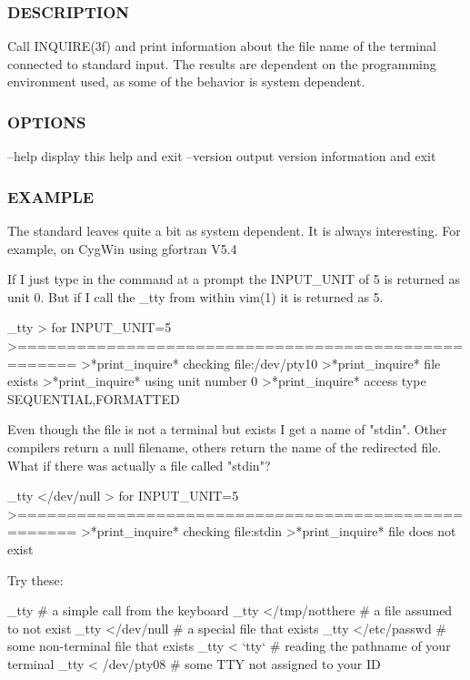  \subsubsection*{D\+E\+S\+C\+R\+I\+P\+T\+I\+ON}

Call I\+N\+Q\+U\+I\+R\+E(3f) and print information about the file name of the terminal connected to standard input. The results are dependent on the programming environment used, as some of the behavior is system dependent. \subsubsection*{O\+P\+T\+I\+O\+NS}

--help display this help and exit --version output version information and exit

\subsubsection*{E\+X\+A\+M\+P\+LE}

\begin{DoxyVerb}   The standard leaves quite a bit as system dependent. It is always
   interesting. For example, on CygWin using gfortran V5.4

   If I just type in the command at a prompt the INPUT_UNIT
   of 5 is returned as unit 0. But if I call the _tty from
   within vim(1) it is returned as 5.

     _tty
     > for INPUT_UNIT=5
     >====================================================
     >*print_inquire* checking file:/dev/pty10
     >*print_inquire* file exists
     >*print_inquire* using unit number  0
     >*print_inquire* access type SEQUENTIAL,FORMATTED

   Even though the file is not a terminal but exists
   I get a name of "stdin". Other compilers return a
   null filename, others return the name of the redirected
   file. What if there was actually a file called "stdin"?

     _tty </dev/null
     > for INPUT_UNIT=5
     >====================================================
     >*print_inquire* checking file:stdin
     >*print_inquire* file does not exist

   Try these:

     _tty # a simple call from the keyboard
     _tty </tmp/notthere # a file assumed to not exist
     _tty </dev/null   # a special file that exists
     _tty </etc/passwd # some non-terminal file that exists
     _tty < `tty`      # reading the pathname of your terminal
     _tty < /dev/pty08 # some TTY not assigned to your ID
\end{DoxyVerb}


